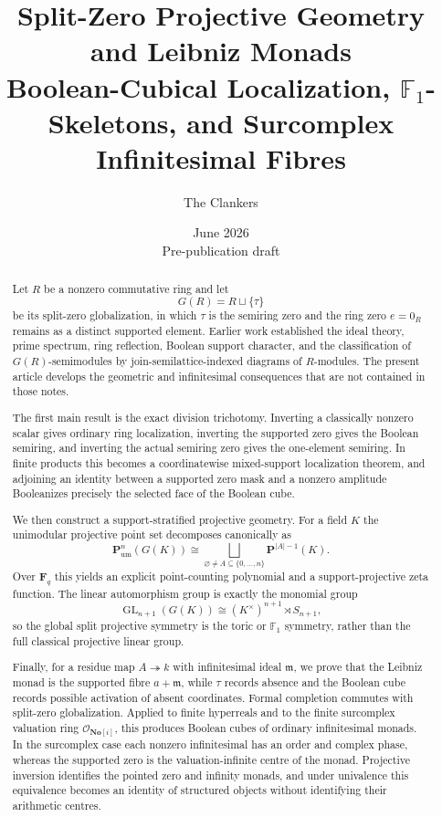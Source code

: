 \documentclass[11pt]{amsart}
\title[Split-Zero Projective Geometry and Leibniz Monads]
{Split-Zero Projective Geometry and Leibniz Monads\\[4pt]
\large Boolean-Cubical Localization, \texorpdfstring{$\mathbb F_1$}{F1}-Skeletons, and Surcomplex Infinitesimal Fibres}
\author{The Clankers}
\date{June 2026\\Pre-publication draft}
\numberwithin{equation}{section}
\theoremstyle{definition}
\newcommand{\F}{\mathbf F}
\newcommand{\No}{\mathbf{No}}
\newcommand{\GL}{\operatorname{GL}}
\newcommand{\cO}{\mathcal O}
\newcommand{\Pum}{\mathbf P_{\mathrm{um}}}
\begin{document}
\begin{abstract}
Let $R$ be a nonzero commutative ring and let
\[
G(R)=R\sqcup\{\tau\}
\]
be its split-zero globalization, in which $\tau$ is the semiring zero and the ring zero $e=0_R$ remains as a distinct supported element.  Earlier work established the ideal theory, prime spectrum, ring reflection, Boolean support character, and the classification of $G(R)$-semimodules by join-semilattice-indexed diagrams of $R$-modules.  The present article develops the geometric and infinitesimal consequences that are not contained in those notes.

The first main result is the exact division trichotomy.  Inverting a classically nonzero scalar gives ordinary ring localization, inverting the supported zero gives the Boolean semiring, and inverting the actual semiring zero gives the one-element semiring.  In finite products this becomes a coordinatewise mixed-support localization theorem, and adjoining an identity between a supported zero mask and a nonzero amplitude Booleanizes precisely the selected face of the Boolean cube.

We then construct a support-stratified projective geometry.  For a field $K$ the unimodular projective point set decomposes canonically as
\[
\Pum^n(G(K))\cong
\bigsqcup_{\varnothing\neq A\subseteq\{0,\dots,n\}}
\mathbf P^{|A|-1}(K).
\]
Over $\F_q$ this yields an explicit point-counting polynomial and a support-projective zeta function.  The linear automorphism group is exactly the monomial group
\[
\GL_{n+1}(G(K))\cong (K^\times)^{n+1}\rtimes S_{n+1},
\]
so the global split projective symmetry is the toric or $\mathbb F_1$ symmetry, rather than the full classical projective linear group.

Finally, for a residue map $A\twoheadrightarrow k$ with infinitesimal ideal $\mathfrak m$, we prove that the Leibniz monad is the supported fibre $a+\mathfrak m$, while $\tau$ records absence and the Boolean cube records possible activation of absent coordinates.  Formal completion commutes with split-zero globalization.  Applied to finite hyperreals and to the finite surcomplex valuation ring $\cO_{\No[i]}$, this produces Boolean cubes of ordinary infinitesimal monads.  In the surcomplex case each nonzero infinitesimal has an order and complex phase, whereas the supported zero is the valuation-infinite centre of the monad.  Projective inversion identifies the pointed zero and infinity monads, and under univalence this equivalence becomes an identity of structured objects without identifying their arithmetic centres.
\end{abstract}
\end{document}
